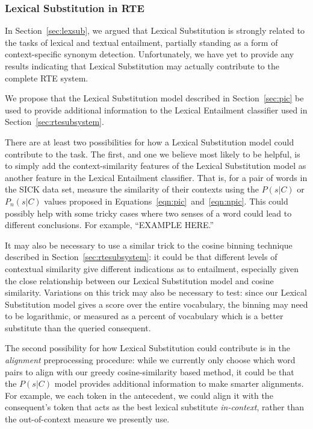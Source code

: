 \documentclass[letterpaper]{article}
\begin{document}
\subsubsection{Lexical Substitution in RTE}

In Section~\ref{sec:lexsub}, we argued that Lexical Substitution is strongly
related to the tasks of lexical and textual entailment, partially standing
as a form of context-specific synonym detection. Unfortunately, we have
yet to provide any results indicating that Lexical Substitution may actually
contribute to the complete RTE system.

We propose that the Lexical Substitution model described in
Section~\ref{sec:pic} be used to provide additional information to
the Lexical Entailment classifier used in Section~\ref{sec:rtesubsystem}.

There are at least two possibilities for how a Lexical Substitution model could
contribute to the task. The first, and one we believe most likely to be
helpful, is to simply add the context-similarity features of the Lexical
Substitution model as another feature in the Lexical Entailment classifier.
That is, for a pair of words in the SICK data set, measure the similarity of
their contexts using the $P(s|C)$ or $P_n(s|C)$ values proposed in
Equations~\ref{eqn:pic}~and~\ref{eqn:npic}. This could possibly help
with some tricky cases where two senses of a word could lead to different conclusions.
For example, ``EXAMPLE HERE.''

It may also be necessary to use a similar trick to the cosine binning technique
described in Section~\ref{sec:rtesubsystem}: it could be that different levels
of contextual similarity give different indications as to entailment, especially
given the close relationship between our Lexical Substitution model and
cosine similarity. Variations on this trick may also be necessary to test:
since our Lexical Substitution model gives a score over the entire vocabulary,
the binning may need to be logarithmic, or measured as a percent of vocabulary
which is a better substitute than the queried consequent.

The second possibility for how Lexical Substitution could contribute is in
the {\em alignment} preprocessing procedure: while we currently only choose
which word pairs to align with our greedy cosine-similarity based method, it
could be that the $P(s|C)$ model provides additional information to make
smarter alignments. For example, we each token in the antecedent, we could
align it with the consequent's token that acts as the best lexical substitute
{\em in-context}, rather than the out-of-context measure we presently use.
\end{document}
